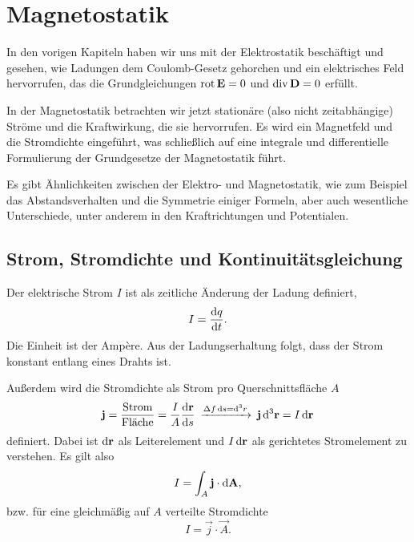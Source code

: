 \chapter{Magnetostatik}


In den vorigen Kapiteln haben wir uns mit der Elektrostatik beschäftigt und gesehen, wie Ladungen dem Coulomb-Gesetz gehorchen und ein elektrisches Feld hervorrufen, das die Grundgleichungen $\rot \vec {E}=0$ und $\divg \vec {D}=0$ erfüllt.

In der Magnetostatik betrachten wir jetzt stationäre (also nicht zeitabhängige) Ströme und die Kraftwirkung, die sie hervorrufen. Es wird ein Magnetfeld und die Stromdichte eingeführt, was schließlich auf eine integrale und differentielle Formulierung der Grundgesetze der Magnetostatik führt.

Es gibt Ähnlichkeiten zwischen der Elektro- und Magnetostatik, wie zum Beispiel das Abstandsverhalten und die Symmetrie einiger Formeln, aber auch wesentliche Unterschiede, unter anderem in den Kraftrichtungen und Potentialen.

\section{Strom, Stromdichte und Kontinuitätsgleichung}

Der elektrische Strom $I$ ist als zeitliche Änderung der Ladung definiert,
\begin{equation*}
	I=\frac{\diff q}{\diff t}.
\end{equation*}
Die Einheit ist der Ampère. Aus der Ladungserhaltung folgt, dass der Strom konstant entlang eines Drahts ist.

Außerdem wird die Stromdichte als Strom pro Querschnittsfläche $A$
\begin{equation*}
	\vec {j}=\frac{\text{Strom}}{\text{Fläche}}=\frac{I}{A}\frac{\diff \vec {\vec {r}}}{\diff s}\:\xrightarrow{\Delta  f\diff s=\diff ^{3}r}\: \vec {j}\diffa[3]{\vec{r}}=I\diff \vec {r}
\end{equation*}
definiert. Dabei ist $\diff\vec r$ als Leiterelement und $I\diff\vec r$ als gerichtetes Stromelement zu verstehen. Es gilt also
\begin{equation*}
	I=\int_A \vec j \cdot \diff \vec A,
\end{equation*}
bzw. für eine gleichmäßig auf $A$ verteilte Stromdichte
\begin{equation*}
	I=\vec j\cdot \vec A.
\end{equation*}


